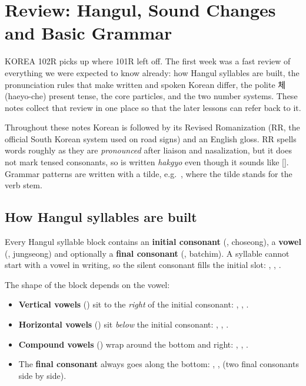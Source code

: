 \chapter{Review: Hangul, Sound Changes and Basic Grammar}

KOREA 102R picks up where 101R left off. The first week was a fast review of everything
we were expected to know already: how Hangul syllables are built, the pronunciation rules
that make written and spoken Korean differ, the polite 체 (haeyo-che) present
tense, the core particles, and the two number systems. These notes collect that review in
one place so that the later lessons can refer back to it.

Throughout these notes Korean is followed by its Revised Romanization (RR, the official
South Korean system used on road signs) and an English gloss. RR spells words roughly as
they are \emph{pronounced} after liaison and nasalization, but it does not mark tensed
consonants, so  is written \emph{hakgyo} even though it sounds like
[]. Grammar patterns are written with a tilde, e.g.\ , where the
tilde stands for the verb stem.

\section{How Hangul syllables are built}

Every Hangul syllable block contains an \textbf{initial consonant} (, choseong), a
\textbf{vowel} (, jungseong) and optionally a \textbf{final consonant}
(, batchim). A syllable cannot start with a vowel in writing, so the silent
consonant  fills the initial slot: , , .

The shape of the block depends on the vowel:
\begin{itemize}
  \item \textbf{Vertical vowels} () sit to the \emph{right} of the
        initial consonant: , , .
  \item \textbf{Horizontal vowels} () sit \emph{below} the initial
        consonant: , , .
  \item \textbf{Compound vowels} () wrap around the bottom and
        right: , , .
  \item The \textbf{final consonant} always goes along the bottom: , ,
         (two final consonants side by side).
\end{itemize}

